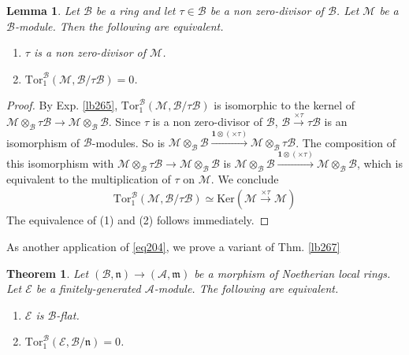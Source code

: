 \documentclass[12pt,b5paper,notitlepage]{report}
\theoremstyle{definition}
\theoremstyle{plain}
\newtheorem{thm}[df]{Theorem}
\newtheorem{lm}[df]{Lemma}
\newcommand{\fk}{\mathfrak}
\newcommand{\mc}{\mathcal}
\newcommand{\id}{\mathbf{1}}
\newcommand{\Ker}{\mathrm{Ker}}
\newcommand{\Tor}{\mathrm{Tor}}
\numberwithin{equation}{section}
\begin{document}
\begin{lm}\label{lb273}
Let $\mc B$ be a ring and let $\tau\in\mc B$ be a non zero-divisor of $\mc B$. Let $\mc M$ be a $\mc B$-module. Then the following are equivalent.
\begin{enumerate}[label=(\arabic*)]
\item $\tau$ is a non zero-divisor of $\mc M$.
\item $\Tor_1^{\mc B}(\mc M,\mc B/\tau\mc B)=0$.
\end{enumerate}
\end{lm}


\begin{proof}
By Exp. \ref{lb265}, $\Tor_1^{\mc B}(\mc M,\mc B/\tau\mc B)$ is isomorphic to the kernel of $\mc M\otimes_{\mc B}\tau\mc B\rightarrow \mc M\otimes_{\mc B}\mc B$. Since $\tau$ is a non zero-divisor of $\mc B$, $\mc B\xrightarrow{\times\tau}\tau\mc B$ is an isomorphism of $\mc B$-modules. So is $\mc M\otimes_{\mc B}\mc B\xrightarrow{\id\otimes(\times\tau)}\mc M\otimes_{\mc B}\tau\mc B$. The composition of this isomorphism with $\mc M\otimes_{\mc B}\tau\mc B\rightarrow \mc M\otimes_{\mc B}\mc B$ is $\mc M\otimes_{\mc B}\mc B\xrightarrow{\id\otimes(\times\tau)}\mc M\otimes_{\mc B}\mc B$, which is equivalent to the multiplication of $\tau$ on $\mc M$. We conclude
\begin{align}
\Tor_1^{\mc B}(\mc M,\mc B/\tau\mc B)\simeq\Ker(\mc M\xrightarrow{\times\tau}\mc M)
\end{align}
The equivalence of (1) and (2) follows immediately.
\end{proof}


As another application of \eqref{eq204},  we prove a variant of Thm. \ref{lb267}

\begin{thm}\label{lb274}
Let $(\mc B,\fk n)\rightarrow(\mc A,\fk m)$ be a morphism of Noetherian local rings. Let $\mc E$ be a finitely-generated $\mc A$-module. The following are equivalent.
\begin{enumerate}[label=(\arabic*)]
\item $\mc E$ is $\mc B$-flat.
\item $\Tor_1^{\mc B}(\mc E,\mc B/\fk n)=0$.
\end{enumerate}
\end{thm}
\end{document}
